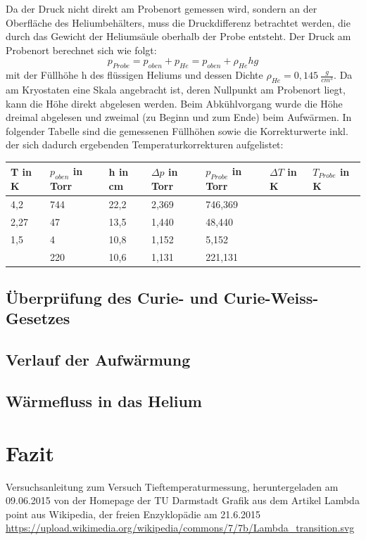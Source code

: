 \documentclass[bigchapter,colorback,accentcolor=tud4b,linedtoc,11pt]{tudreport}
\begin{document}
Da der Druck nicht direkt am Probenort gemessen wird, sondern an der Oberfläche des Heliumbehälters, muss die Druckdifferenz betrachtet werden, die durch das Gewicht der Heliumsäule oberhalb der Probe entsteht. Der Druck am Probenort berechnet sich wie folgt: 
$$p_{Probe} = p_{oben} + p_{He} = p_{oben} + \rho_{He} h g$$
mit der Füllhöhe h des flüssigen Heliums und dessen Dichte $\rho_{He} = 0,145 ~ \frac{g}{cm^3}$. Da am Kryostaten eine Skala angebracht ist, deren Nullpunkt am Probenort liegt, kann die Höhe direkt abgelesen werden. Beim Abkühlvorgang wurde die Höhe dreimal abgelesen und zweimal (zu Beginn und zum Ende) beim Aufwärmen. In folgender Tabelle sind die gemessenen Füllhöhen sowie die Korrekturwerte inkl. der sich dadurch ergebenden Temperaturkorrekturen aufgelistet:

\begin{center}
  \begin{tabular}{|p{1.6cm}|p{2.4cm}|p{1.6cm}|p{2cm}|p{2.4cm}|p{2cm}|p{2cm}|}
    \hline
    T in K & $p_{oben}$ in Torr & h in cm & $\Delta p$ in Torr & $p_{Probe}$ in Torr & $\Delta T$ in K & $T_{Probe}$ in K \\ \hline
    4,2 & 744 & 22,2 & 2,369 & 746,369 &  &   \\ \hline
    2,27 & 47 & 13,5 & 1,440 & 48,440 &  &    \\ \hline
    1,5 & 4 & 10,8 & 1,152 & 5,152 &  &    \\ \hline
     & 220 & 10,6 & 1,131 & 221,131 &  &    \\ \hline
	\end{tabular}
\end{center}

\section{Überprüfung des Curie- und Curie-Weiss-Gesetzes}

\section{Verlauf der Aufwärmung}

\section{Wärmefluss in das Helium}

\chapter{Fazit}

\cleardoublepage{}
\newpage
\begin{thebibliography}{100}
   Versuchsanleitung zum Versuch Tieftemperaturmessung, heruntergeladen am 09.06.2015 von der Homepage der TU Darmstadt
   Grafik aus dem Artikel Lambda point aus Wikipedia, der freien Enzyklopädie am 21.6.2015 \url{https://upload.wikimedia.org/wikipedia/commons/7/7b/Lambda_transition.svg}
  
\end{thebibliography}
\end{document}
